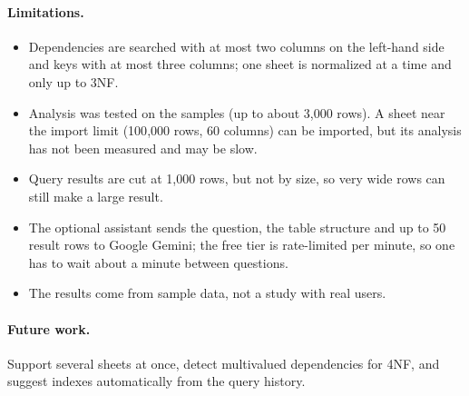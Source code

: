 \paragraph{Limitations.}
\begin{itemize}
  \item Dependencies are searched with at most two columns on the left-hand side and keys with at most
  three columns; one sheet is normalized at a time and only up to 3NF.
  \item Analysis was tested on the samples (up to about 3{,}000 rows). A sheet near the import limit
  (100{,}000 rows, 60 columns) can be imported, but its analysis has not been measured and may be slow.
  \item Query results are cut at 1{,}000 rows, but not by size, so very wide rows can still make a large
  result.
  \item The optional assistant sends the question, the table structure and up to 50 result rows to
  Google Gemini; the free tier is rate-limited per minute, so one has to wait about a minute between questions.
  \item The results come from sample data, not a study with real users.
\end{itemize}

\paragraph{Future work.} Support several sheets at once, detect multivalued dependencies for 4NF, and
suggest indexes automatically from the query history.
